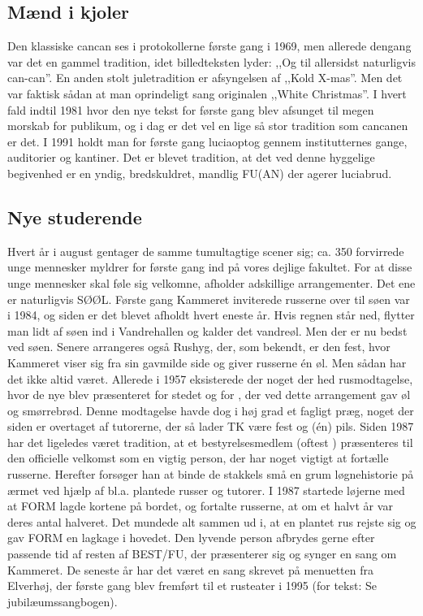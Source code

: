\subsection{Mænd i kjoler}
Den klassiske cancan ses i protokollerne første gang i 1969, men allerede dengang var det en gammel tradition, idet billedteksten lyder: ,,Og til allersidst naturligvis can-can''. En anden stolt juletradition er afsyngelsen af ,,Kold X-mas''. Men det var faktisk sådan at man oprindeligt sang originalen ,,White Christmas''. I hvert fald indtil 1981 hvor den nye tekst for første gang blev afsunget til megen morskab for publikum, og i dag er det vel en lige så stor tradition som cancanen er det. I 1991 holdt man for første gang luciaoptog gennem institutternes gange, auditorier og kantiner. Det er blevet tradition, at det ved denne hyggelige begivenhed er en yndig, bredskuldret, mandlig FU(AN) der agerer luciabrud.

\subsection{Nye studerende}
Hvert år i august gentager de samme tumultagtige scener sig; ca. 350 forvirrede unge mennesker myldrer for første gang ind på vores dejlige fakultet. For at disse unge mennesker skal føle sig velkomne, afholder \TKET adskillige arrangementer. Det ene er naturligvis SØØL. Første gang Kammeret inviterede russerne over til søen var i 1984, og siden er det blevet afholdt hvert eneste år. Hvis regnen står ned, flytter man lidt af søen ind i Vandrehallen og kalder det vandreøl. Men der er nu bedst ved søen. Senere arrangeres også Rushyg, der, som bekendt, er den fest, hvor Kammeret viser sig fra sin gavmilde side og giver russerne én øl. Men sådan har det ikke altid været. Allerede i 1957 eksisterede der noget der hed rusmodtagelse, hvor de nye blev præsenteret for stedet og for \TKET, der ved dette arrangement gav øl og smørrebrød. Denne modtagelse havde dog i høj grad et fagligt præg, noget der siden er overtaget af tutorerne, der så lader TK være fest og (én) pils. Siden 1987 har det ligeledes været tradition, at et bestyrelsesmedlem (oftest \CERM) præsenteres til den officielle velkomst som en vigtig person, der har noget vigtigt at fortælle russerne. Herefter forsøger han at binde de stakkels små en grum løgnehistorie på ærmet ved hjælp af bl.a. plantede russer og tutorer. I 1987 startede løjerne med at FORM lagde kortene på bordet, og fortalte russerne, at om et halvt år var deres antal halveret. Det mundede alt sammen ud i, at en plantet rus rejste sig og gav FORM en lagkage i hovedet. Den lyvende person afbrydes gerne efter passende tid af resten af BEST/FU, der præsenterer sig og synger en sang om Kammeret. De seneste år har det været en sang skrevet på menuetten fra Elverhøj, der første gang blev fremført til et rusteater i 1995 (for tekst: Se jubilæumssangbogen).

